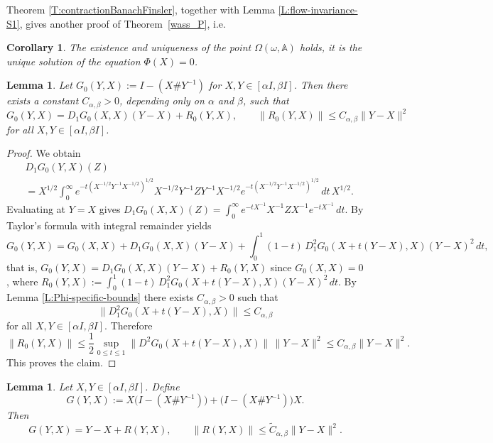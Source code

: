 \documentclass[12pt,reqno]{amsart}
\newtheorem{corollary}[theorem]{Corollary}
\newtheorem{lemma}[theorem]{Lemma}
\begin{document}
Theorem \ref{T:contractionBanachFinsler}, together with Lemma
\ref{L:flow-invariance-S1}, gives another proof of Theorem~\ref{wass_P}, i.e.

\begin{corollary}\label{uniq}
The existence and uniqueness of the point \(\Omega(\omega,\mathbb A)\) holds, it is the unique solution of the equation $\Phi(X) = 0$.
\end{corollary}


\begin{lemma}\label{L:G0-Taylor}
Let $G_0(Y,X) := I - (X \# Y^{-1})$ for $X, Y \in [\alpha I,\beta I]$.
Then there exists a constant \( C_{\alpha,\beta} > 0 \), depending only on $\alpha$ and $\beta$,
such that
\[
G_0(Y,X) = D_1G_0(X,X)(Y-X) + R_0(Y,X),
\qquad
\| R_0(Y,X) \| \le C_{\alpha,\beta} \| Y-X \|^2
\]
for all \( X,Y \in [\alpha I,\beta I] \).
\end{lemma}

\begin{proof}
We obtain
\begin{equation*}
\begin{split}
&D_1G_0(Y,X)(Z)\\
&=
X^{1/2} \int_0^\infty
e^{-t(X^{-1/2}Y^{-1}X^{-1/2})^{1/2}} X^{-1/2}Y^{-1}ZY^{-1}X^{-1/2} e^{-t(X^{-1/2}Y^{-1}X^{-1/2})^{1/2}} \, dt \, X^{1/2}.
\end{split}
\end{equation*}
Evaluating at \(Y=X\) gives
$D_1G_0(X,X)(Z)
= \int_0^\infty e^{-tX^{-1}}X^{-1}ZX^{-1}e^{-tX^{-1}}\,dt$.
By Taylor's formula with integral remainder yields
\[
G_0(Y,X) = G_0(X,X) + D_1G_0(X,X)(Y-X)
+ \int_0^1 (1-t) \, D_1^2G_0(X+t(Y-X), X)(Y-X)^2 \, dt,
\]
that is,
$G_0(Y,X) = D_1G_0(X,X)(Y-X) + R_0(Y,X)$ since $G_{0}(X,X) = 0$,
where
$R_0(Y,X)
:= \int_0^1 (1-t) \, D_1^2G_0(X+t(Y-X), X)(Y-X)^2 \, dt$.
By Lemma \ref{L:Phi-specific-bounds} there exists $C_{\alpha,\beta} > 0$ such that
\[
\| D_1^2G_0(X+t(Y-X), X) \|
\le
C_{\alpha,\beta}
\]
for all \( X,Y \in [\alpha I,\beta I] \). Therefore
\[
\| R_0(Y,X) \|
\le
\frac{1}{2}
\sup_{0 \le t \le 1} \| D^2G_0(X+t(Y-X), X) \|
\, \| Y-X \|^2
\le
C_{\alpha,\beta} \| Y-X \|^2.
\]
This proves the claim.
\end{proof}

\begin{lemma}\label{L:G-Taylor}
Let $X, Y \in [\alpha I, \beta I]$. Define
\begin{equation}\label{eq:def-G-normalized}
G(Y,X) :=
X \bigl( I - (X \# Y^{-1}) \bigr) + \bigl( I - (X \# Y^{-1}) \bigr) X.
\end{equation}
Then
\begin{equation*}\label{eq:G-normalized-expansion}
G(Y,X) = Y-X + R(Y,X),
\qquad
\| R(Y,X) \| \le \widetilde C_{\alpha,\beta} \| Y-X \|^2.
\end{equation*}
\end{lemma}
\end{document}
